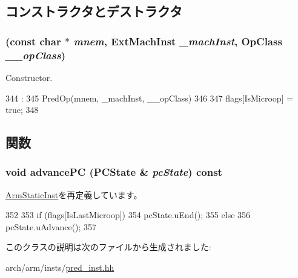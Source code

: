 \subsection{コンストラクタとデストラクタ}
\hypertarget{classArmISA_1_1PredMicroop_acf4caa1f1a88e8ec2dde3d9e82a80b44}{
\subsubsection[{PredMicroop}]{ (const char $\ast$ {\em mnem}, \/  {\bf ExtMachInst} {\em \_\-machInst}, \/  OpClass {\em \_\-\_\-opClass})}}
\label{classArmISA_1_1PredMicroop_acf4caa1f1a88e8ec2dde3d9e82a80b44}


Constructor. 


\begin{DoxyCode}
344                                                                             :
345                 PredOp(mnem, _machInst, __opClass)
346     {
347         flags[IsMicroop] = true;
348     }

\end{DoxyCode}


\subsection{関数}
\hypertarget{classArmISA_1_1PredMicroop_af04cd01429462d48e635f3e01ced6257}{
\subsubsection[{advancePC}]{\setlength{\rightskip}{0pt plus 5cm}void advancePC (PCState \& {\em pcState}) const}}
\label{classArmISA_1_1PredMicroop_af04cd01429462d48e635f3e01ced6257}


\hyperlink{classArmISA_1_1ArmStaticInst_af04cd01429462d48e635f3e01ced6257}{ArmStaticInst}を再定義しています。


\begin{DoxyCode}
352     {
353         if (flags[IsLastMicroop])
354             pcState.uEnd();
355         else
356             pcState.uAdvance();
357     }
\end{DoxyCode}


このクラスの説明は次のファイルから生成されました:\begin{DoxyCompactItemize}
\item 
arch/arm/insts/\hyperlink{pred__inst_8hh}{pred\_\-inst.hh}\end{DoxyCompactItemize}
